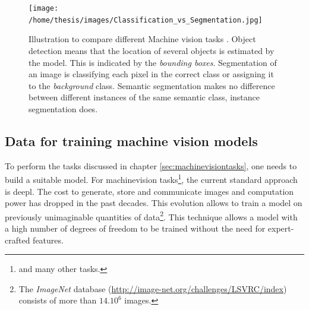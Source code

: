 \begin{figure}
    \centering
    \texttt{[image: /home/thesis/images/Classification\_vs\_Segmentation.jpg]}
    \caption{Illustration to compare different Machine vision tasks \cite{SemTorch76:online}. 
    Object detection means that the location of several objects is estimated by the model. This is indicated by the \textit{bounding boxes}.
    Segmentation of an image is classifying each pixel in the correct class or assigning it to the \textit{background} class.
    Semantic segmentation makes no difference between different instances of the same semantic class, instance segmentation does.
    \label{fig:machinevisiontasks}}
\end{figure}


\subsection{Data for training machine vision models\label{sec:trainingData}}
\par{
    To perform the tasks discussed in chapter \ref{sec:machinevisiontasks}, one needs to build a suitable model.
    For \Gls{machinevision} tasks\footnote{and many other tasks.}, the current standard approach is \Gls{deepl}.
    The cost to generate, store and communicate images and computation power has dropped in the past decades.
    This evolution allows to train a model  on previously unimaginable quantities of data\footnote{The \textit{ImageNet} database (\url{http://image-net.org/challenges/LSVRC/index}) consists of more than $14.10^6$ images.}.
    This technique allows a model with a high number of degrees of freedom to be trained without the need for expert-crafted \Gls{features}. 
}
